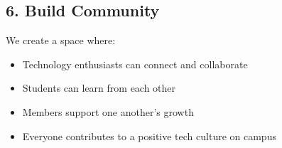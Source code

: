 \subsection*{6. Build Community}

We create a space where:

\begin{itemize}[leftmargin=2em, itemsep=0.3em]
    \item Technology enthusiasts can connect and collaborate
    \item Students can learn from each other
    \item Members support one another's growth
    \item Everyone contributes to a positive tech culture on campus
\end{itemize}
